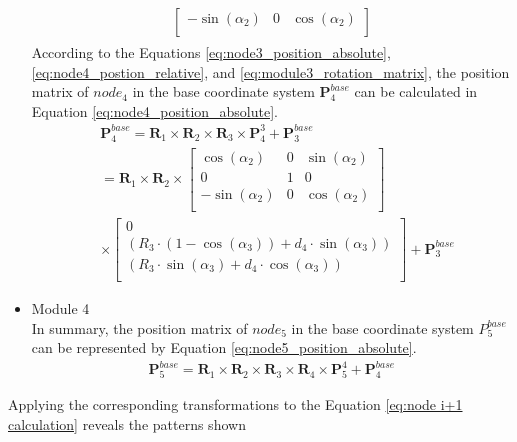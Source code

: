 \begin{itemize}
\begin{align}
\begin{aligned}
\begin{bmatrix}
                -\sin(\alpha_2) & 0 & \cos(\alpha_2) \\
            \end{bmatrix}
        \end{aligned}
        \label{eq:module3_rotation_matrix}
    \end{align}
    According to the Equations \ref{eq:node3_position_absolute}, \ref{eq:node4_postion_relative}, and 
    \ref*{eq:module3_rotation_matrix},     the position matrix of $node_{4}$ in the base coordinate system 
    $\textbf{P}_{4}^{base}$ can be calculated in Equation \ref{eq:node4_position_absolute}.
    \begin{align}
        &\textbf{P}_{4}^{base} = \textbf{R}_{1} \times\textbf{R}_{2} \times\textbf{R}_{3} \times \textbf{P}_{4}^{3} + \textbf{P}_{3}^{base} \nonumber \\
        &= \textbf{R}_{1}\times\textbf{R}_{2}\times
        \begin{bmatrix}
            \cos(\alpha_2) & 0 & \sin(\alpha_2) \\
            0 & 1 & 0 \\
            -\sin(\alpha_2) & 0 & \cos(\alpha_2) \\
        \end{bmatrix} \nonumber \\
        &\times
        \begin{bmatrix}
            0 \\
            (R_3\cdot(1-\cos(\alpha_3)) + d_4\cdot \sin(\alpha_3)) \\
            (R_3\cdot \sin(\alpha_3) + d_4\cdot \cos(\alpha_3)) \\
        \end{bmatrix} + \textbf{P}_{3}^{base}
        \label{eq:node4_position_absolute}
    \end{align}
    \item Module 4 \\
    In summary, the position matrix of $node_5$ in the base coordinate system $P_5^{base}$can be represented by 
    Equation \ref{eq:node5_position_absolute}.
    \begin{align}
        \textbf{P}_{5}^{base} = \textbf{R}_{1} \times\textbf{R}_{2} \times\textbf{R}_{3} \times\textbf{R}_{4} \times \textbf{P}_{5}^{4} + \textbf{P}_{4}^{base}
        \label{eq:node5_position_absolute}
    \end{align}
\end{itemize}
Applying the corresponding transformations to the Equation \ref{eq:node i+1 calculation} reveals the patterns shown 
